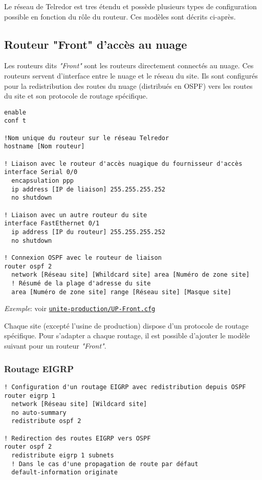 \documentclass{article}
\newcommand{\tlr}{Telredor\xspace}
\newcommand{\seefile}[1]{
  \begin{center}
  \begin{minipage}{0.9\textwidth}
    \emph{Exemple}: voir \texttt{\href{https://github.com/EpicKiwi/Wide-Network-Project-Cesi-A4/blob/master/network/#1}{#1}}
  \end{minipage}
  \end{center}
}
\begin{document}
Le réseau de \tlr est tres étendu et possède plusieurs types de configuration possible en fonction du rôle du routeur.
Ces modèles sont décrits ci-après.

\subsection{Routeur "Front" d'accès au nuage}

Les routeurs dits \emph{"Front"} sont les routeurs directement connectés au nuage.
Ces routeurs servent d'interface entre le nuage et le réseau du site.
Ils sont configurés pour la redistribution des routes du nuage (distribués en OSPF) vers les routes du site et son protocole de routage spécifique.

\begin{lstlisting}[caption=Modèle de configuration d'un routeur "Front"]
enable
conf t

!Nom unique du routeur sur le réseau Telredor
hostname [Nom routeur]

! Liaison avec le routeur d'accès nuagique du fournisseur d'accès
interface Serial 0/0
  encapsulation ppp
  ip address [IP de liaison] 255.255.255.252
  no shutdown

! Liaison avec un autre routeur du site
interface FastEthernet 0/1
  ip address [IP du routeur] 255.255.255.252
  no shutdown

! Connexion OSPF avec le routeur de liaison
router ospf 2
  network [Réseau site] [Whildcard site] area [Numéro de zone site]
  ! Résumé de la plage d'adresse du site
  area [Numéro de zone site] range [Réseau site] [Masque site]
\end{lstlisting}

\seefile{unite-production/UP-Front.cfg}

Chaque site (excepté l'usine de production) dispose d'un protocole de routage spécifique.
Pour s'adapter a chaque routage, il est possible d'ajouter le modèle suivant pour un routeur \emph{"Front"}.

\subsubsection{Routage EIGRP}

\begin{lstlisting}[caption=Configuration d'un routeur "Front" avec EIGRP]
! Configuration d'un routage EIGRP avec redistribution depuis OSPF
router eigrp 1
  network [Réseau site] [Wildcard site]
  no auto-summary
  redistribute ospf 2

! Redirection des routes EIGRP vers OSPF
router ospf 2
  redistribute eigrp 1 subnets
  ! Dans le cas d'une propagation de route par défaut
  default-information originate
\end{lstlisting}
\end{document}
